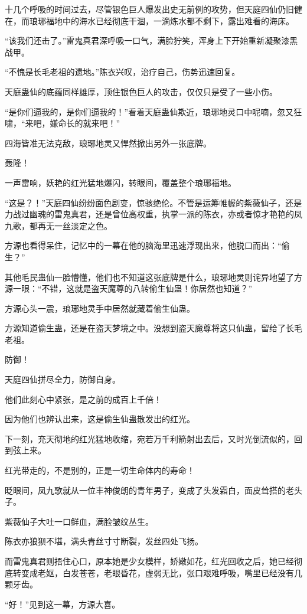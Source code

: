 \begin{this_body}
十几个呼吸的时间过去，尽管银色巨人爆发出史无前例的攻势，但天庭四仙仍旧健在，而琅琊福地中的海水已经彻底干涸，一滴炼水都不剩下，露出难看的海床。

“该我们还击了。”雷鬼真君深呼吸一口气，满脸狞笑，浑身上下开始重新凝聚漆黑战甲。

“不愧是长毛老祖的遗地。”陈衣兴叹，治疗自己，伤势迅速回复。

天庭蛊仙的底蕴同样雄厚，顶住银色巨人的攻击，仅仅只是受了一些小伤。

“是你们逼我的，是你们逼我的！”看着天庭蛊仙欺近，琅琊地灵口中呢喃，忽又狂啸，“来吧，嫌命长的就来吧！”

四海皆准无法克敌，琅琊地灵又悍然掀出另外一张底牌。

轰隆！

一声雷响，妖艳的红光猛地爆闪，转眼间，覆盖整个琅琊福地。

“这是？！”天庭四仙纷纷面色剧变，惊骇绝伦。不管是运筹帷幄的紫薇仙子，还是力战过幽魂的雷鬼真君，还是曾位高权重，执掌一派的陈衣，亦或者惊才艳艳的凤九歌，都再无一丝淡定之色。

方源也看得呆住，记忆中的一幕在他的脑海里迅速浮现出来，他脱口而出：“偷生？”

其他毛民蛊仙一脸懵懂，他们也不知道这张底牌是什么，琅琊地灵则诧异地望了方源一眼：“不错，这就是盗天魔尊的八转偷生仙蛊！你居然也知道？”

方源心头一震，琅琊地灵手中居然就藏着偷生仙蛊。

方源知道偷生蛊，还是在盗天梦境之中。没想到盗天魔尊将这只仙蛊，留给了长毛老祖。

防御！

天庭四仙拼尽全力，防御自身。

他们此刻心中紧张，是之前的成百上千倍！

因为他们也辨认出来，这是偷生仙蛊散发出的红光。

下一刻，充天彻地的红光猛地收缩，宛若万千利箭射出去后，又时光倒流似的，回到弦上来。

红光带走的，不是别的，正是一切生命体内的寿命！

眨眼间，凤九歌就从一位丰神俊朗的青年男子，变成了头发霜白，面皮耸搭的老头子。

紫薇仙子大吐一口鲜血，满脸皱纹丛生。

陈衣亦狼狈不堪，满头青丝寸寸断裂，发丝四处飞扬。

而雷鬼真君则捂住心口，原本她是少女模样，娇嫩如花，红光回收之后，她已经彻底转变成老妪，白发苍苍，老眼昏花，虚弱无比，张口艰难呼吸，嘴里已经没有几颗牙齿。

“好！”见到这一幕，方源大喜。


\end{this_body}
